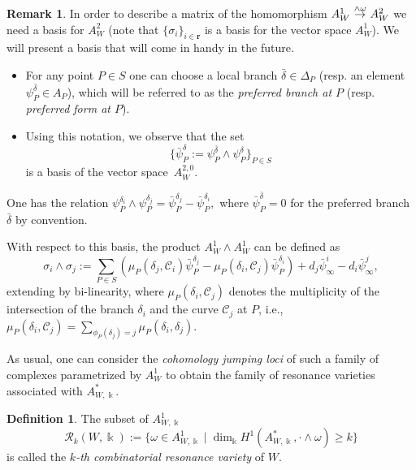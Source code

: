 \documentclass[11pt]{amsart}
\DeclareMathOperator{\depth}{depth}
\def\cC{\mathcal{C}}
\def\cR{{\mathcal R}}
\def\kk{\Bbbk}
\def\w{\omega}
\def\rightmap#1{\smash{\mathop{\rightarrow}\limits^{#1}}}
\theoremstyle{plain}
\theoremstyle{definition}
\newtheorem{definition}[thm]{Definition}
\newtheorem{remark}[thm]{Remark}
\begin{document}
\begin{remark}
\label{rem-basis-A2}
In order to describe a matrix of the homomorphism
$A_W^1 \ \rightmap{\wedge \omega} \ A_W^2$ we need a basis for
$A_W^2$ (note that $\{\sigma_i\}_{i\in \mathbf r}$ is a basis for the vector space $A_W^1$).
We will present a basis that will come in handy in the future.
\begin{itemize}
\label{rem:basis-A2}
\item
For any point $P\in S$ one can choose a local branch $\bar\delta\in \Delta_P$
(resp. an element $\psi_P^{\bar\delta}\in A_P$), which will be referred to as the
\emph{preferred branch at $P$} (resp. \emph{preferred form at $P$}).
\item
Using this notation, we observe that the set
\begin{equation}
\label{eq:basis-A2}
\{\bar\psi_P^{\delta}:=\psi_P^{\bar\delta}\wedge \psi_P^{\delta}\}_{P\in S}
\end{equation}
is a basis of the vector space~$A^{2,0}_W$.
\end{itemize}
One has the relation 
$\psi_P^{\delta_i}\wedge\psi_P^{\delta_j}=\bar\psi_P^{\delta_j}-\bar\psi_P^{\delta_i},$
where $\bar\psi_P^{\bar \delta}=0$ for the preferred branch $\bar\delta$ by convention.

With respect to this basis, the product $A^1_W\wedge A^1_W$ can be defined as
\begin{equation}
\label{eq:product2}
\sigma_i\wedge\sigma_j:=
\sum_{P\in S} (\mu_P(\delta_j,\cC_i)\bar\psi_P^{\delta_j}-\mu_P(\delta_i,\cC_j)\bar\psi_P^{\delta_i})
+d_j\bar\psi^i_\infty-d_i\bar\psi^j_\infty,
\end{equation}
extending by bi-linearity, where $\mu_P(\delta_i,\cC_j)$ denotes the multiplicity of the intersection of
the branch $\delta_i$ and the curve $\cC_j$ at $P$, i.e.,
${\displaystyle{
\mu_P(\delta_i,\cC_j)=\sum_{\phi_P(\delta_j)=j} \mu_P(\delta_i,\delta_j)}}$.
\end{remark}

As usual, one can consider the \emph{cohomology jumping loci} of such a family of complexes
parametrized by $A_W^1$ to obtain the family of resonance varieties associated with $A_{W,\kk}^*$.

\begin{definition}
The subset of $A_{W,\kk}^1$
$$\cR_k(W,\kk):=\{\omega \in A_{W,\kk}^1 \mid \dim_\kk H^1(A_{W,\kk}^*,\cdot\wedge \w)\geq k\}$$
is called the \emph{$k$-th combinatorial resonance variety} of $W$. 
\end{definition}
\end{document}
